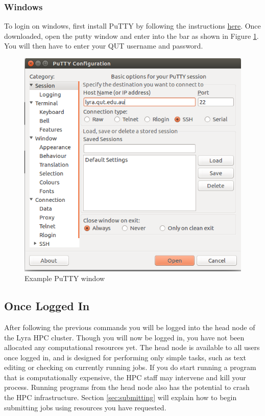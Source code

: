 \subsubsection{Windows}
To login on windows, first install PuTTY by following the instructions \href{https://www.putty.org/}{here}. Once downloaded, open the putty window and enter  into the bar as shown in Figure \ref{fig:putty}. You will then have to enter your QUT username and password.
\begin{figure}[!h]
  \centering
  \includegraphics[width=0.5\linewidth]{./figs/putty.png}
  \caption{Example PuTTY window}
  \label{fig:putty}
\end{figure}
%
%
\subsection{Once Logged In}
After following the previous commands you will be logged into the head node of the Lyra HPC cluster. Though you will now be logged in, you have not been allocated any computational resources yet. The head node is available to all users once logged in, and is designed for performing only simple tasks, such as text editing or checking on currently running jobs. If you do start running a program that is computationally expensive, the HPC staff may intervene and kill your process. Running programs from the head node also has the potential to crash the HPC infrastructure. Section \ref{sec:submitting} will explain how to begin submitting jobs using resources you have requested.
%
%
\par
%
%
